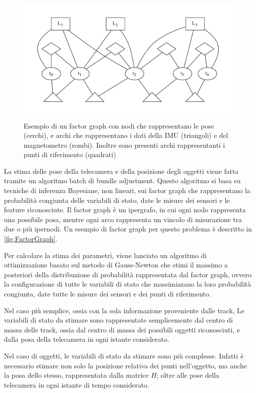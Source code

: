 \begin{figure}[ht]
  \includegraphics[width=\textwidth]{diagrammi/FactorGraph}
  \caption[Esempio di Factor Graph]{Esempio di un factor graph con nodi che rappresentano le pose (cerchi), e archi che rappresentano i dati della IMU (triangoli) e del magnetometro (rombi). Inoltre sono presenti archi rappresentanti i punti di riferimento (quadrati) }
  \label{fig:FactorGraph}
\end{figure}

La stima delle pose della telecamera e della posizione degli oggetti viene fatta tramite un algoritmo batch di bundle adjustment.
Questo algoritmo si basa su tecniche di inferenza Bayesiane, non lineari, sui factor graph che rappresentano la probabilità congiunta delle variabili di stato, date le misure dei sensori e le feature riconosciute.
Il factor graph è un ipergrafo, in cui ogni nodo rappresenta una possibile posa, mentre ogni arco rappresenta un vincolo di misurazione tra due o più ipernodi. Un esempio di factor graph per questo problema è descritto in \autoref{fig:FactorGraph}.

Per calcolare la stima dei parametri, viene lanciato un algoritmo di ottimizzazione basato sul metodo di Gauss-Newton che stimi il massimo a posteriori della distribuzione di probabilità rappresentata dal factor graph, ovvero la configurazione di tutte le variabili di stato che massimizzano la loro probabilità congiunta, date tutte le misure dei sensori e dei punti di riferimento.

Nel caso più semplice, ossia con la sola informazione proveniente dalle track, Le variabili di stato da stimare sono rappresentate semplicemente dal centro di massa delle track, ossia dal centro di massa dei possibili oggetti riconosciuti, e dalla posa della telecamera in ogni istante considerato.

Nel caso di oggetti, le variabili di stato da stimare sono più complesse. Infatti è necessario stimare non solo la posizione relativa dei punti nell'oggetto, ma anche la posa dello stesso, rappresentata dalla matrice $H$; oltre alle pose della telecamera in ogni istante di tempo considerato.


